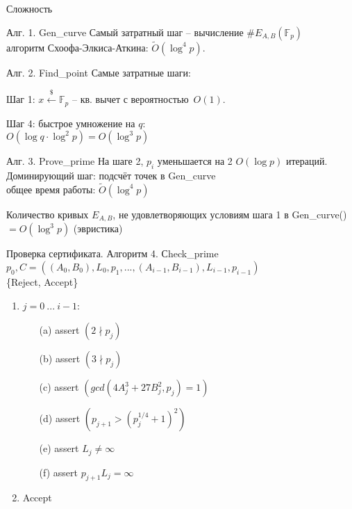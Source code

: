 \documentclass{beamer}
\begin{document}
\begin{frame}{Сложность}
\begin{block}{Алг. 1. Gen\_curve}
Самый затратный шаг -- вычисление $\#E_{A,B}(\mathbb{F}_p)$ \\\structure{$\implies$}
алгоритм Схоофа-Элкиса-Аткина: $\widetilde{O}(\log^4 p)$.
\end{block}
\begin{block}{Алг. 2. Find\_point}
Самые затратные шаги:

Шаг 1: $x \xleftarrow{\$} \mathbb{F}_p$ -- кв. вычет с вероятностью~$O(1)$.

Шаг 4: быстрое умножение на $q$:\\$O(\log q \cdot \log^2 p) = O(\log^3 p)$
\end{block}

\begin{block}{Алг. 3. Prove\_prime}
На шаге 2, $p_i$ уменьшается на 2 \structure{$\implies$} $O(\log p)$ итераций.\\
Доминирующий шаг: подсчёт точек в Gen\_curve \\
\structure{$\implies$} общее время работы: $\widetilde{O}(\log^4 p)$

Количество кривых $E_{A,B}$, не удовлетворяющих условиям шага 1 в Gen\_curve() $= O(\log^3 p)$ (эвристика)
\end{block}
\end{frame}

\begin{frame}{Проверка сертификата. Алгоритм 4. Сheck\_prime}
 $p_0, C =((A_0, B_0), L_0, p_1, ..., (A_{i-1}, B_{i-1}), L_{i-1}, p_{i-1})$\\
 \{Reject, Accept\}
\begin{enumerate}
    \item {} $j = 0\ ...\ i-1$:
    \begin{enumerate}
        \item[(a)] assert $(2 \nmid p_j)$
        \item[(b)] assert $(3 \nmid p_j)$
        \item[(c)] assert $(gcd(4A^3_j + 27B_j^2, p_j) = 1)$
        \item[(d)] assert $(p_{j+1} > (p_j^{1/4} + 1)^2)$
        \item[(e)] assert $L_j \neq \infty$
        \item[(f)] assert $p_{j+1}L_j = \infty$
    \end{enumerate}
    \item {} Accept
\end{enumerate}
\end{frame}
\end{document}
